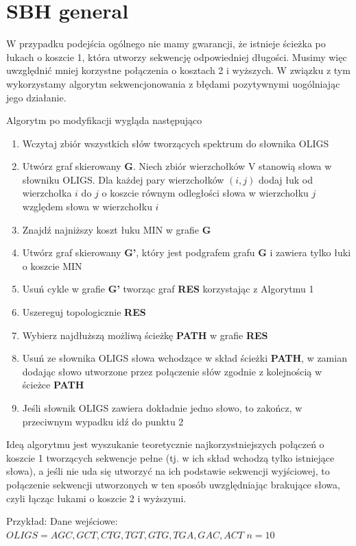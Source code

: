 \documentclass[a4paper,10pt]{article}
\begin{document}
\section{SBH general}
W przypadku podejścia ogólnego nie mamy gwarancji, że istnieje ścieżka po łukach o koszcie 1, która utworzy sekwencję odpowiedniej długości. Musimy więc uwzględnić mniej korzystne połączenia o kosztach 2 i wyższych. W związku z tym wykorzystamy algorytm sekwencjonowania z błędami pozytywnymi uogólniając jego działanie.

Algorytm po modyfikacji wygląda następująco
\begin{enumerate}
 \item Wczytaj zbiór wszystkich słów tworzących spektrum do słownika OLIGS
 \item Utwórz graf skierowany {\bf G}. Niech zbiór wierzchołków V stanowią słowa w słowniku OLIGS. Dla każdej pary wierzchołków $(i,j)$ dodaj łuk od wierzchołka $i$ do $j$ o koszcie równym odległości słowa w wierzchołku $j$ względem słowa w wierzchołku $i$
 \item Znajdź najniższy koszt łuku MIN w grafie {\bf G}
 \item Utwórz graf skierowany {\bf G'}, który jest podgrafem grafu {\bf G} i zawiera tylko łuki o koszcie MIN
 \item Usuń cykle w grafie {\bf G'} tworząc graf {\bf RES} korzystając z Algorytmu 1
 \item Uszereguj topologicznie {\bf RES}
 \item Wybierz najdłuższą możliwą ścieżkę {\bf PATH} w grafie {\bf RES}
 \item Usuń ze słownika OLIGS słowa wchodzące w skład ścieżki {\bf PATH}, w zamian dodając słowo utworzone przez połączenie słów zgodnie z kolejnością w ścieżce {\bf PATH}
 \item Jeśli słownik OLIGS zawiera dokładnie jedno słowo, to zakończ, w przeciwnym wypadku idź do punktu 2
\end{enumerate}

Ideą algorytmu jest wyszukanie teoretycznie najkorzystniejszych połączeń o koszcie 1 tworzących sekwencje pełne (tj. w ich skład wchodzą tylko istniejące słowa), a jeśli nie uda się utworzyć na ich podstawie sekwencji wyjściowej, to połączenie sekwencji utworzonych w ten sposób uwzględniając brakujące słowa, czyli łącząc łukami o koszcie 2 i wyższymi. 

Przykład:
Dane wejściowe:
$OLIGS = { AGC, GCT, CTG, TGT, GTG, TGA, GAC, ACT }$
$n = 10$
\end{document}
